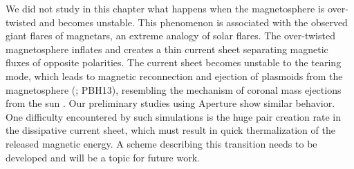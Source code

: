 We did not study in this chapter what happens when the magnetosphere is
over-twisted and becomes unstable. This phenomenon is associated with the
observed giant flares of magnetars, an extreme analogy of solar flares. The
over-twisted magnetosphere inflates and creates a thin current sheet separating
magnetic fluxes of opposite polarities. The current sheet becomes
unstable to the tearing mode, which leads to magnetic reconnection and ejection
of plasmoids from the magnetosphere (\citealp{lyutikov_explosive_2003}; PBH13), resembling the
mechanism of coronal mass ejections from the sun
\cite[e.g.][]{mikic_disruption_1994}.
Our preliminary studies using Aperture show similar behavior.
One difficulty encountered by such simulations is the huge pair creation rate
in the dissipative current sheet, which must result in quick thermalization
of the released magnetic energy. A scheme describing this transition needs to
be developed and will be a topic for future work.

